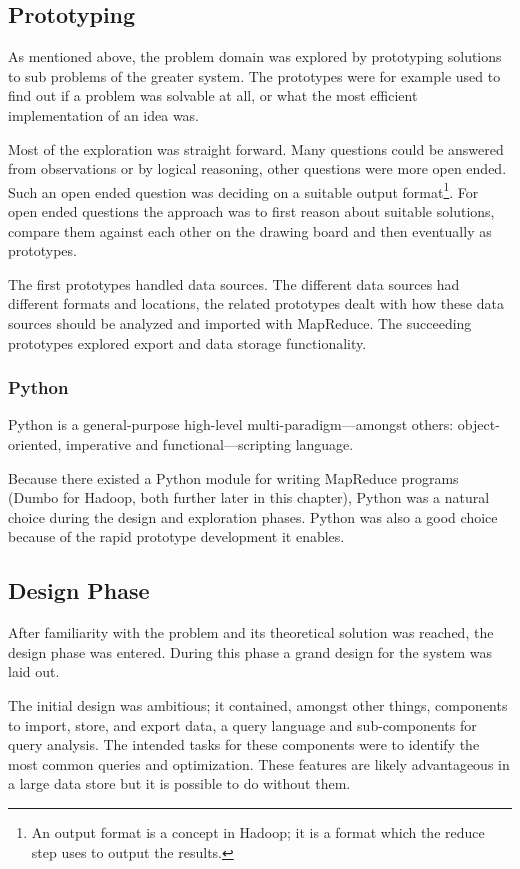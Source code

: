 \subsection*{Prototyping}

As mentioned above, the problem domain was explored by prototyping solutions to
sub problems of the greater system. The prototypes were for example used to find
out if a problem was solvable at all, or what the most efficient implementation
of an idea was.

Most of the exploration was straight forward. Many questions could be answered
from observations or by logical reasoning, other questions were more open ended.
Such an open ended question was deciding on a suitable output format\footnote{An
output format is a concept in Hadoop; it is a format which the reduce step uses
to output the results.}. For open ended questions the approach was to first
reason about suitable solutions, compare them against each other on the drawing
board and then eventually as prototypes.

The first prototypes handled data sources. The different data sources had
different formats and locations, the related prototypes dealt with how these
data sources should be analyzed and imported with MapReduce. The succeeding
prototypes explored export and data storage functionality.


\subsubsection{Python}

Python is a general-purpose high-level multi-paradigm---amongst others:
object-oriented, imperative and functional---scripting language. \cite{python}

Because there existed a Python module for writing MapReduce programs (Dumbo for
Hadoop, both further later in this chapter), Python was a natural choice during
the design and exploration phases. Python was also a good choice because of the
rapid prototype development it enables.


\subsection*{Design Phase}

After familiarity with the problem and its theoretical solution was reached,
the design phase was entered. During this phase a grand design for the system
was laid out.

The initial design was ambitious; it contained, amongst other things, components
to import, store, and export data, a query language and sub-components for
query analysis. The intended tasks for these components were to identify the
most common queries and optimization. These features are likely advantageous in
a large data store but it is possible to do without them.

